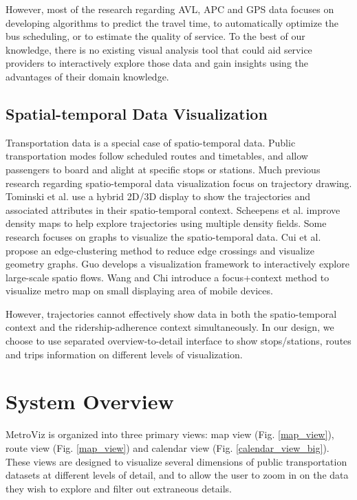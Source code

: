 \documentclass[journal]{vgtc}                %
\begin{document}
However, most of the research regarding AVL, APC and GPS data focuses on developing algorithms to predict the travel time, to automatically optimize the bus scheduling, or to estimate the quality of service. To the best of our knowledge, there is no existing visual analysis tool that could aid service providers to interactively explore those data and gain insights using the advantages of their domain knowledge.

\subsection{Spatial-temporal Data Visualization}
Transportation data is a special case of spatio-temporal data. Public transportation modes follow scheduled routes and timetables, and allow passengers to board and alight at specific stops or stations. Much previous research regarding spatio-temporal data visualization focus on trajectory drawing. 
Tominski et al. \cite{Tominski2012} use a hybrid 2D/3D display to show the trajectories and associated attributes in their spatio-temporal context.
Scheepens et al. \cite{6065019} improve density maps to help explore trajectories using multiple density fields.
Some research focuses on graphs to visualize the spatio-temporal data.
Cui et al. \cite{4658140} propose an edge-clustering method to reduce edge crossings and visualize geometry graphs.
Guo \cite{5290710} develops a visualization framework to interactively explore large-scale spatio flows.
Wang and Chi \cite{6065020} introduce a focus+context method to visualize metro map on small displaying area of mobile devices.

However, trajectories cannot effectively show data in both the spatio-temporal context and the ridership-adherence context simultaneously. In our design, we choose to use separated overview-to-detail interface to show stops/stations, routes and trips information on different levels of visualization.

\section{System Overview}
MetroViz is organized into three primary views: map view (Fig. \ref{map_view}), route view (Fig. \ref{map_view}) and calendar view (Fig. \ref{calendar_view_big}). These views are designed to visualize several dimensions of public transportation datasets at different levels of detail, and to allow the user to zoom in on the data they wish to explore and filter out extraneous details.
\end{document}
